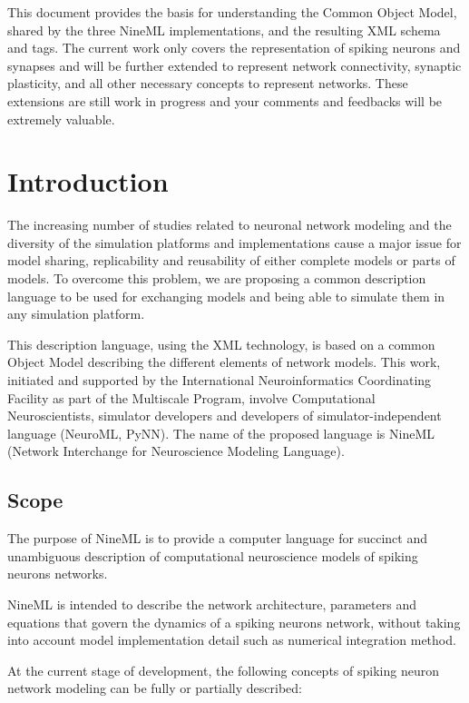 \documentclass{article}
\begin{document}
This document provides the basis for understanding the Common Object
Model, shared by the three NineML implementations, and the resulting XML
schema and tags. The current work only covers the representation of
spiking neurons and synapses and will be further extended to represent
network connectivity, synaptic plasticity, and all other necessary
concepts to represent networks.  These extensions are still work in
progress and your comments and feedbacks will be extremely valuable.

\newpage
\tableofcontents

\newpage

\section{Introduction}

The increasing number of studies related to neuronal network modeling
and the diversity of the simulation platforms and implementations
cause a major issue for model sharing, replicability and reusability
of either complete models or parts of models. To overcome this problem,
we are proposing a
common description language to be used for exchanging models and being
able to simulate them in any simulation platform.

This description language, using the XML technology, is based on a
common Object Model describing the different elements of network
models. This work, initiated and supported by the International
Neuroinformatics Coordinating Facility as part of the Multiscale
Program, involve Computational Neuroscientists, simulator developers and
developers of simulator-independent language (NeuroML, PyNN).  The name of the
proposed language is NineML (Network Interchange for Neuroscience Modeling
Language).

\subsection{Scope}

The purpose of NineML is to provide a computer language for
succinct and unambiguous description of computational neuroscience models of
spiking neurons networks.

NineML is intended to describe the network architecture, parameters
and equations that govern the dynamics of a spiking neurons network, without
taking into account model implementation detail such as numerical integration
method.

At the current stage of development, the following concepts of spiking neuron
network modeling can be fully or partially described:
\end{document}
